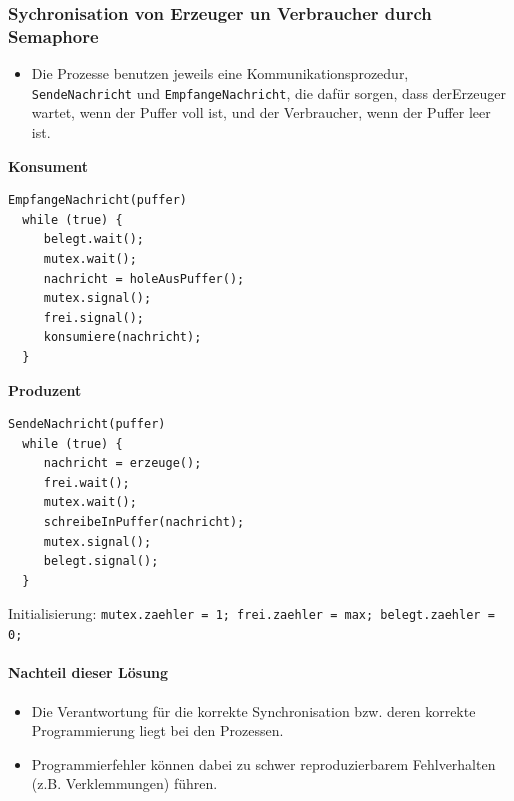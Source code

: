 \documentclass[11pt]{article}
\begin{document}
\subsubsection*{Sychronisation von Erzeuger un Verbraucher durch Semaphore}
\label{sec:orgaffe63a}

\begin{itemize}
\item Die Prozesse benutzen jeweils eine Kommunikationsprozedur,
\texttt{SendeNachricht} und \texttt{EmpfangeNachricht}, die dafür sorgen, dass
derErzeuger wartet, wenn der Puffer voll ist, und der Verbraucher,
wenn der Puffer leer ist.
\end{itemize}


\begin{nebeneinander}
\textbf{Konsument}
\begin{verbatim}
EmpfangeNachricht(puffer)
  while (true) {
     belegt.wait();
     mutex.wait();
     nachricht = holeAusPuffer(); 
     mutex.signal();
     frei.signal();
     konsumiere(nachricht); 
  }
\end{verbatim}
\end{nebeneinander}
\begin{nebeneinander}
\textbf{Produzent}
\begin{verbatim}
SendeNachricht(puffer)
  while (true) {
     nachricht = erzeuge();
     frei.wait();
     mutex.wait();
     schreibeInPuffer(nachricht); 
     mutex.signal();
     belegt.signal();
  }
\end{verbatim}
\end{nebeneinander}
\begin{clear}
\end{clear}

Initialisierung: \texttt{mutex.zaehler = 1; frei.zaehler = max; belegt.zaehler = 0;}

\paragraph*{Nachteil dieser Lösung}
\label{sec:orge7fe319}
\begin{itemize}
\item Die Verantwortung für die korrekte Synchronisation bzw. deren
korrekte Programmierung liegt bei den Prozessen.
\item Programmierfehler können dabei zu schwer reproduzierbarem
Fehlverhalten (z.B. Verklemmungen) führen.
\end{itemize}
\end{document}
